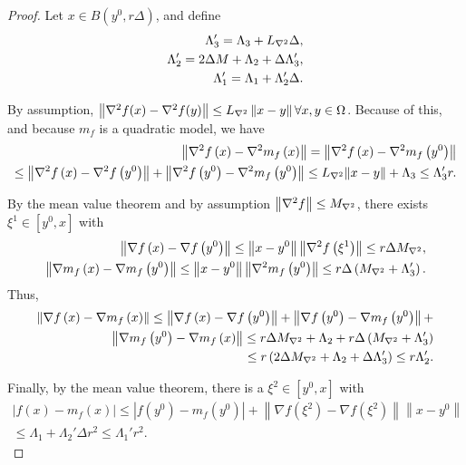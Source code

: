 \begin{proof}
Let $x \in B\left(y^{0}, r\Delta\right)$, and define
\begin{align*}
\Lambda_3' = \Lambda_3 + {L_{\nabla^2}} \Delta, \\
\Lambda_2' = 2 \Delta M + \Lambda_2 +  \Delta \Lambda_3',\\
\Lambda_1' = \Lambda_1 + \Lambda_2' \Delta.
\end{align*}

By assumption, $\left\|\nabla^2 f(x) - \nabla^2 f(y)\right\| \le {L_{\nabla^2}}\left\|x-y\right\| \forall x,y \in \Omega$.
Because of this, and because $m_f$ is a quadratic model, we have
\begin{align*}
\left\| \nabla^2 f\left(x\right) - \nabla^2 m_f\left(x\right)\right\|
= \left\| \nabla^2 f\left(x\right) - \nabla^2 m_f\left(y^0\right)\right\| \\
\le \left\| \nabla^2 f\left(x\right) - \nabla^2 f\left(y^0\right)\right\| + \left\| \nabla^2 f\left(y^0\right) - \nabla^2 m_f\left(y^0\right)\right\|
\le {L_{\nabla^2}} \|x - y\| + \Lambda_3 \le  \Lambda_3' r .
\end{align*}

By the mean value theorem and by assumption $\left\|\nabla^2 f\right\| \le {M_{\nabla^2}}$, there exists $\xi^1 \in [y^0, x]$ with
\begin{align*}
\left\|\nabla f\left(x\right) - \nabla f\left(y^0\right) \right\|
\le \left\|x - y^0\right\| \left\| \nabla^2 f\left(\xi^1\right) \right\|
\le r \Delta {M_{\nabla^2}}, \\
\left\|\nabla m_f\left(x\right) - \nabla m_f\left(y^0\right) \right\|
\le \left\|x - y^0\right\| \left\| \nabla^2 m_f\left(y^0\right) \right\|
\le r \Delta \left({M_{\nabla^2}} + \Lambda_3'\right).
\end{align*}
Thus, 
\begin{align*}
\left\|\nabla f\left(x\right) - \nabla m_f\left(x\right)\right\| \le 
\left\| \nabla f\left(x\right) - \nabla f\left(y^0\right) \right\| +
\left\|\nabla f\left(y^0\right) - \nabla m_f\left(y^0\right)\right\| + \\ \left\|\nabla m_f\left(y^0\right) - \nabla m_f\left(x\right)\right\|
\le r \Delta {M_{\nabla^2}} + \Lambda_2 + r \Delta \left({M_{\nabla^2}} + \Lambda_3'\right) \\
\le r \left(2 \Delta {M_{\nabla^2}} + \Lambda_2 +  \Delta \Lambda_3'\right)
\le r \Lambda_2'.
\end{align*}

Finally, by the mean value theorem, there is a $\xi^2 \in [y^0, x]$ with
\begin{align*}
\left|f(x) - m_f(x)\right|
\le \left| f(y^0) - m_f(y^0) \right| + \left\| \nabla f(\xi^2) - \nabla f(\xi^2) \right\| \left\|x - y^0\right\| \\
\le \Lambda_1 + \Lambda_2' \Delta r^2
\le \Lambda_1' r^2.
\end{align*}

\end{proof}
